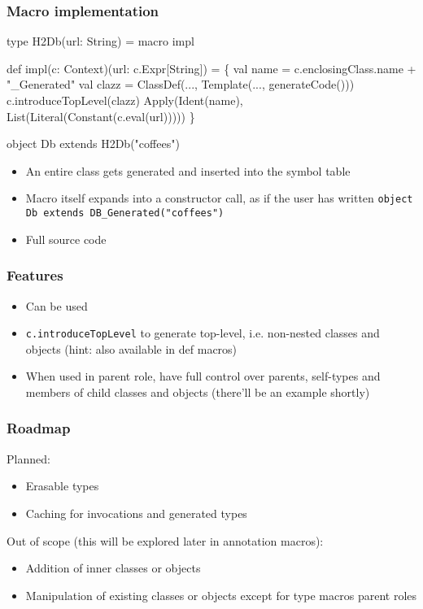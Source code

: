 \documentclass[svgnames,hyperref={bookmarks=false}]{beamer}
\begin{document}
\begin{frame}[fragile]
\frametitle{Macro implementation}
\begin{semiverbatim}
type H2Db(url: String) = macro impl

def impl(c: Context)(url: c.Expr[String]) = \{
  val name = c.enclosingClass.name + "_Generated"
  val clazz = ClassDef(..., Template(..., generateCode()))
  c.introduceTopLevel(clazz)
  Apply(Ident(name), List(Literal(Constant(c.eval(url)))))
\}

object Db extends H2Db("coffees")
\end{semiverbatim}

\begin{itemize}
\item An entire class gets generated and inserted into the symbol table
\item Macro itself expands into a constructor call, as if the user has written \texttt{object Db extends DB\_Generated("coffees")}
\item Full source code 
\end{itemize}
\end{frame}

\begin{frame}[fragile]
\frametitle{Features}

\begin{itemize}
\item Can be used 
\item \texttt{c.introduceTopLevel} to generate top-level, i.e. non-nested classes and objects (hint: also available in def macros)
\item When used in parent role, have full control over parents, self-types and members of child classes and objects (there'll be an example shortly)
\end{itemize}
\end{frame}

\begin{frame}[fragile]
\frametitle{Roadmap}

Planned:
\begin{itemize}
\item Erasable types
\item Caching for invocations and generated types
\end{itemize}
\vskip25pt
Out of scope (this will be explored later in annotation macros):
\begin{itemize}
\item Addition of inner classes or objects
\item Manipulation of existing classes or objects except for type macros parent roles
\end{itemize}
\end{frame}
\end{document}
